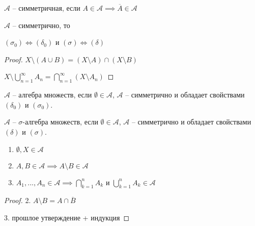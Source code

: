 \begin{definition}\thmslashn

	$\mathcal{A}$ -- симметричная, если $A \in \mathcal{A} \implies \overline{A} \in \mathcal{A}$

\end{definition}


\begin{statement}\thmslashn
	
	$\mathcal{A}$ -- симметрично, то
	
	$(\sigma_0) \iff (\delta_0)$ и $(\sigma) \iff (\delta)$
\end{statement}

\begin{proof}\thmslashn
	
	$X\setminus (A\cup B) = (X\setminus A) \cap (X\setminus B)$
	
	
	$X\setminus \bigcup\limits_{n=1}^{\infty}A_n = \bigcap\limits_{n = 1}^{\infty} (X\setminus A_n)$
\end{proof}

\begin{definition}\thmslashn
	
	$\mathcal{A}$ -- алгебра множеств, если  $\emptyset \in \mathcal{A}$, $\mathcal{A}$ -- симметрично и обладает свойствами $(\delta_0)$ и $(\sigma_0)$.
	
	$\mathcal{A}$ -- $\sigma$-алгебра множеств, если  $\emptyset \in \mathcal{A}$, $\mathcal{A}$ -- симметрично и обладает свойствами $(\delta)$ и $(\sigma)$.
	
\end{definition}


\begin{properties}\thmslashn
	
	\begin{enumerate}
		
		\item $\emptyset,X \in \mathcal{A}$
		
		\item $A,B \in \mathcal{A} \implies A\setminus B \in \mathcal{A}$
		
		\item $A_1,...,A_n \in \mathcal{A} \implies \bigcap\limits_{k=1}^n A_k $ и $\bigcup\limits_{k=1}^n A_k \in \mathcal{A}$
		
		
	\end{enumerate}
\end{properties}


\begin{proof}\thmslashn
	
	2. $A\setminus B = A \cap \overline{B}$
	
	3. прошлое утверждение + индукция
\end{proof}


